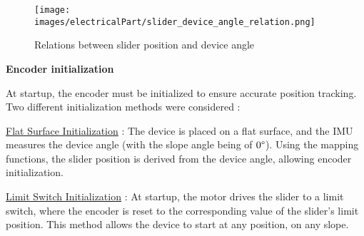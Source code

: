 \documentclass[lettersize,journal]{IEEEtran}
\begin{document}


\[
\]




\begin{figure}[ht]
\centering
\texttt{[image: images/electricalPart/slider\_device\_angle\_relation.png]}
\caption{Relations between slider position and device angle}
\label{slider device}
\end{figure}

\FloatBarrier

\medskip
\noindent\textbf{Encoder initialization}

At startup, the encoder must be initialized to ensure accurate position tracking. Two different initialization methods were considered :

\noindent \underline{Flat Surface Initialization} : The device is placed on a flat surface, and the IMU measures the device angle (with the slope angle being of $0\degree$). Using the mapping functions, the slider position is derived from the device angle, allowing encoder initialization.


\noindent \underline{Limit Switch Initialization} : At startup, the motor drives the slider to a limit switch, where the encoder is reset to the corresponding value of the slider's limit position. This method allows the device to start at any position, on any slope.
\end{document}
